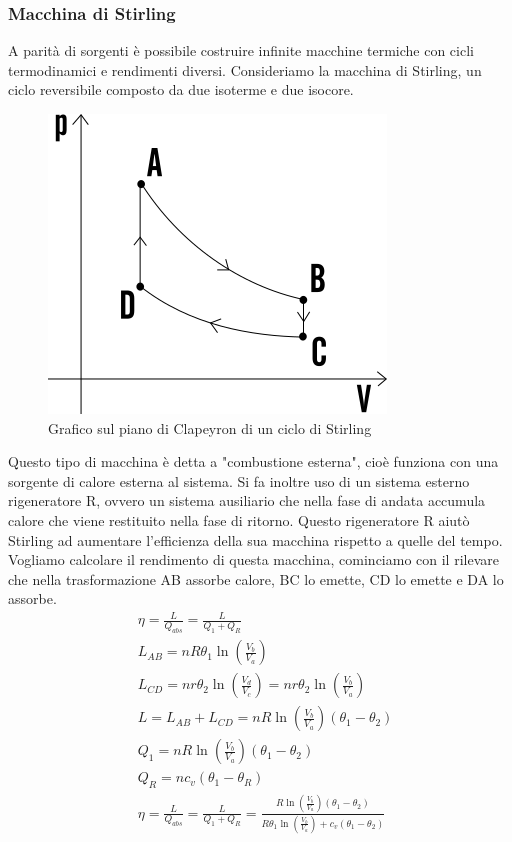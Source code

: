 \documentclass[
10pt, %
a4paper, %
oneside, %
headinclude,footinclude, %
BCOR5mm, %
]{scrartcl}
\begin{document}
\subsubsection{Macchina di Stirling}
A parità di sorgenti è possibile costruire infinite macchine termiche con cicli termodinamici e rendimenti diversi. Consideriamo la macchina di Stirling, un ciclo reversibile composto da due isoterme e due isocore. 
\begin{figure}[h!]
	\centering
	\includegraphics[width=0.4\linewidth]{../images/ciclo_di_stirling}
	\caption{Grafico sul piano di Clapeyron di un ciclo di Stirling}
	\label{fig:ciclodistirling}
\end{figure}
\FloatBarrier
Questo tipo di macchina è detta a "combustione esterna", cioè funziona con una sorgente di calore esterna al sistema. Si fa inoltre uso di un sistema esterno rigeneratore R, ovvero un sistema ausiliario che nella fase di andata accumula calore che viene restituito nella fase di ritorno. Questo rigeneratore R aiutò Stirling ad aumentare l'efficienza della sua macchina rispetto a quelle del tempo. Vogliamo calcolare il rendimento di questa macchina, cominciamo con il rilevare che nella trasformazione AB assorbe calore, BC lo emette, CD lo emette e DA lo assorbe. 
\begin{align*}
	&\eta = \frac{L}{Q_{abs}} = \frac{L}{Q_1 + Q_R}\\
	&L_{AB}= n R \theta_1 \ln\left(\frac{V_b}{V_a}\right)\\
	&L_{CD}= n r \theta_2 \ln\left(\frac{V_d}{V_c}\right) = n r \theta_2 \ln\left(\frac{V_b}{V_a}\right)\\
	&L = L_{AB} + L_{CD} = n R \ln\left(\frac{V_b}{V_a}\right)(\theta_1 - \theta_2)\\
	&Q_1 = n R \ln\left(\frac{V_b}{V_a}\right)(\theta_1 - \theta_2)\\
	&Q_R = n c_v (\theta_1 - \theta_R)\\
	&\eta = \frac{L}{Q_{abs}} = \frac{L}{Q_1 + Q_R} = \frac{R \ln\left(\frac{V_b}{V_a}\right)(\theta_1 - \theta_2)}{R\theta_1\ln(\frac{V_b}{V_a})+c_v (\theta_1 - \theta_2)}
\end{align*}
\end{document}
